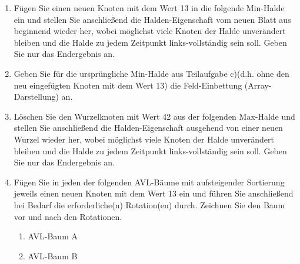 \documentclass{lehramt-informatik-aufgabe}
\begin{document}
\begin{enumerate}

\item Fügen Sie einen neuen Knoten mit dem Wert 13 in die folgende
Min-Halde ein und stellen Sie anschließend die Halden-Eigenschaft vom
neuen Blatt aus beginnend wieder her, wobei möglichst viele Knoten der
Halde unverändert bleiben und die Halde zu jedem Zeitpunkt
links-vollständig sein soll. Geben Sie nur das Endergebnis an.


\item Geben Sie für die ursprüngliche Min-Halde aus Teilaufgabe c)(d.h.
ohne den neu eingefügten Knoten mit dem Wert 13) die Feld-Einbettung
(Array-Darstellung) an.


\item Löschen Sie den Wurzelknoten mit Wert 42 aus der folgenden
Max-Halde und stellen Sie anschließend die Halden-Eigenschaft ausgehend
von einer neuen Wurzel wieder her, wobei möglichst viele Knoten der
Halde unverändert bleiben und die Halde zu jedem Zeitpunkt
links-vollständig sein soll. Geben Sie nur das Endergebnis an.


\item Fügen Sie in jeden der folgenden AVL-Bäume mit aufsteigender
Sortierung jeweils einen neuen Knoten mit dem Wert 13 ein und führen Sie
anschließend bei Bedarf die erforderliche(n) Rotation(en) durch.
Zeichnen Sie den Baum vor und nach den Rotationen.

\begin{enumerate}


\item AVL-Baum A


\item AVL-Baum B
\end{enumerate}
\end{enumerate}
\end{document}
